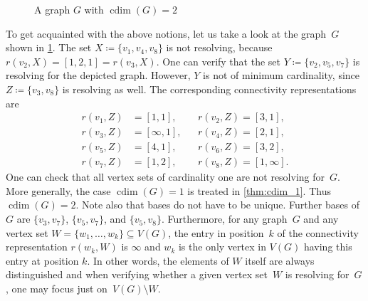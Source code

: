 \documentclass[letterpaper,12pt,headings=normal,parskip=half]{scrartcl}
\DeclareMathOperator{\cdim}{cdim}
\theoremstyle{definition}
\begin{document}
\begin{figure}
    \centering
    \caption{A graph $G$ with $\cdim(G)=2$}
    \label{fig:introexample}
\end{figure}

To get acquainted with the above notions, let us take a look at the graph~$G$ shown in \cref{fig:introexample}. 
The set ${{X\coloneqq\{v_1,v_4,v_8\}}}$ is not resolving, because ${{r(v_2,X) = [1,2,1] = r(v_3,X)}}$. 
One can verify that the set ${{Y\coloneqq\{v_2,v_5,v_7\}}}$ is resolving for the depicted graph. However, $Y$ is not of minimum cardinality, since ${{Z\coloneqq\{v_3,v_8\}}}$ is resolving as well. 
The corresponding connectivity representations are
\begin{align*}
    r(v_1,Z) &= [1,1],&&r(v_2,Z) = [3,1], \\
    r(v_3,Z) &= [\infty,1],&&r(v_4,Z) = [2,1], \\
    r(v_5,Z) &= [4,1],&&r(v_6,Z) = [3,2], \\
    r(v_7,Z) &= [1,2],&&r(v_8,Z) = [1,\infty].
\end{align*}
One can check that all vertex sets of cardinality one are not resolving for~$G$. 
More generally, the case ${{\cdim(G)=1}}$ is treated in \cref{thm:cdim_1}. 
Thus ${{\cdim(G)=2}}$. Note also that bases do not have to be unique. 
Further bases of $G$ are $\{v_3,v_7\}$, $\{v_5,v_7\}$, and $\{v_5,v_8\}$. 
Furthermore, for any graph~$G$ and any vertex set ${{W=\{w_1,\ldots,w_k\}\subseteq V(G)}}$, the entry in position~$k$ of the connectivity representation $r(w_k,W)$ is $\infty$ and $w_k$ is the only vertex in $V(G)$ having this entry at position $k$. 
In other words, the elements of $W$ itself are always distinguished and when verifying whether a given vertex set~$W$ is resolving for~$G$, one may focus just on~${{V(G)\setminus W}}$.
\end{document}
